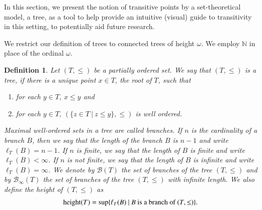 \documentclass[a4paper,12pt]{article} %
\newtheorem{definition}[theorem]{Definition}
\begin{document}
In this section,  we present the notion of transitive points by a set-theoretical model, a tree, as a tool to help provide an intuitive (visual) guide to transitivity in this setting, to potentially aid future research.

We restrict our definition of trees to connected trees of height $\omega$. We employ $\mathbb N$ in place of the ordinal $\omega$.
\begin{definition}
Let $(T,\leq)$ be a partially ordered set.  We say that $(T,\leq)$ is a \emph{\color{blue}  tree}, if there is a unique point $x\in T$, the root of $T$,  such that 
\begin{enumerate}
\item for each $y\in T$, $x\leq y$ and 
\item for each $y\in T$,   $(\{z\in T \ | \ z\leq y\},\leq)$ is well ordered. 
\end{enumerate}
Maximal well-ordered sets in a tree are called \emph{\color{blue} branches}.  If $n$ is the cardinality of a branch $B$, then we say that \emph{\color{blue} the length of the branch $B$ is $n-1$} and write \emph{\color{blue} $\ell_T(B)=n-1$}. If $n$ is finite, we say that \emph{\color{blue} the length of $B$ is finite} and write \emph{\color{blue}$\ell_T(B)<\infty$}.  If $n$ is not finite, we say that \emph{\color{blue} the length of $B$ is infinite} and write \emph{\color{blue}$\ell_T(B)=\infty$}.  We denote by  \emph{\color{blue} $\mathcal B(T)$} the set of branches of the tree $(T,\leq)$ and by  \emph{\color{blue} $\mathcal B_{\infty}(T)$} the set of branches of the tree $(T,\leq)$ with infinite length. We also define  \emph{\color{blue}  the height of $(T,\leq)$ } as
$$
\textup{height}(T)=\sup\{\ell_T(B) \ | \ B \textup{ is a branch of } (T,\leq)\}.
$$
\end{definition}
\end{document}
